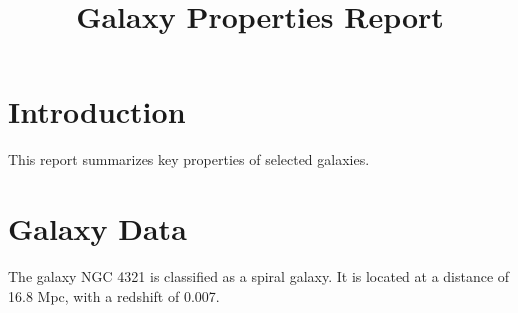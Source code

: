 \documentclass{article}
\title{Galaxy Properties Report}
\author{}
\date{}
\begin{document}
\maketitle

\section{Introduction}
This report summarizes key properties of selected galaxies.

\section{Galaxy Data}
The galaxy NGC 4321 is classified as a spiral galaxy. 
It is located at a distance of 16.8 Mpc, with a redshift of 0.007.
\end{document}
